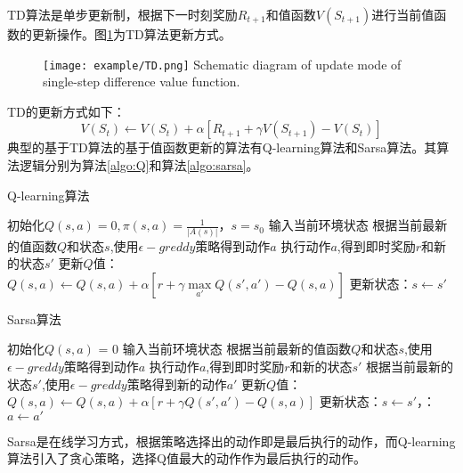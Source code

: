 TD算法是单步更新制，根据下一时刻奖励$ {R_{t + 1}}$和值函数$V({S_{t + 1}}) $进行当前值函数的更新操作。图\ref{fig:6}为TD算法更新方式。
\begin{figure}[htpb]
	\centering
	\texttt{[image: example/TD.png]}
	{Schematic diagram of update mode of single-step difference value function.}
	\label{fig:6}
\end{figure}
TD的更新方式如下：
\begin{equation}
\label{eq:td}
V({S_t}) \leftarrow V({S_t}) + \alpha [{R_{t + 1}} + \gamma V({S_{t + 1}}) - V({S_t})]
\end{equation}
典型的基于TD算法的基于值函数更新的算法有Q-learning算法和Sarsa算法。其算法逻辑分别为算法\ref{algo:Q}和算法\ref{algo:sarsa}。

\begin{algorithm}
	\caption{Q-learning算法}
	\label{algo:Q}
	\begin{algorithmic}[1] %
		\State 初始化$Q(s,a) = 0,\pi (s,a) = \frac{1}{{|A(s)|}}，s = {s_0}$
		\State 输入当前环境状态
		  \State 
		根据当前最新的值函数$Q$和状态$ s $,使用$\epsilon - greddy$策略得到动作$ a $
		  \State 执行动作$ a$,得到即时奖励$r$和新的状态$ s'$
		  \State 更新$ Q $值：$ Q(s,a) \leftarrow Q(s,a) + \alpha [r + \gamma \mathop {\max }\limits_{a'} Q(s',a') - Q(s,a)]$
		  \State 更新状态：$s \leftarrow s'$
		  \EndFor
		\EndFor
	\end{algorithmic}
\end{algorithm}

\begin{algorithm}
	\caption{Sarsa算法}
	\label{algo:sarsa}
	\begin{algorithmic}[1] %
		\State 初始化$Q(s,a)$ = 0
		\Repeat 
		\State 输入当前环境状态
		\State 根据当前最新的值函数$Q$和状态$ s $,使用$\epsilon - greddy$策略得到动作$ a $
		\State 执行动作$ a$,得到即时奖励$r$和新的状态$ s'$
		\State 根据当前最新的状态$ s' $,使用$\epsilon - greddy$策略得到新的动作$ a' $
		\State 更新$ Q $值：$ Q(s,a) \leftarrow Q(s,a) + \alpha [r + \gamma Q(s',a') - Q(s,a)]$
		\State 更新状态：$s \leftarrow s'$，：$a \leftarrow a'$
		\EndFor
	\end{algorithmic}
\end{algorithm}
Sarsa是在线学习方式，根据策略选择出的动作即是最后执行的动作，而Q-learning算法引入了贪心策略，选择Q值最大的动作作为最后执行的动作。

